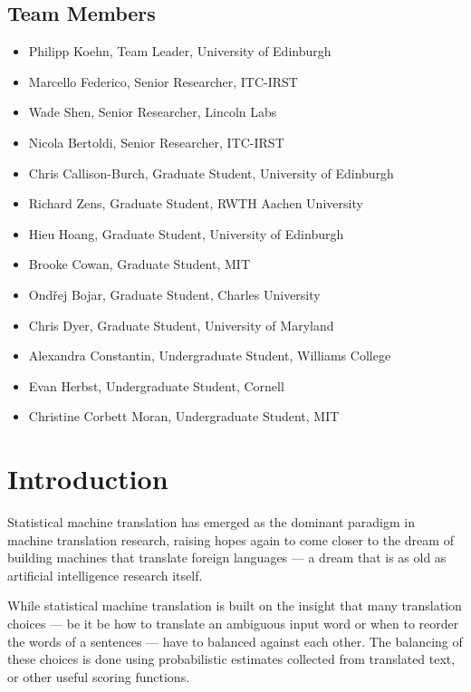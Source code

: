 \documentclass[11pt]{report}
\theoremstyle{plain}
\begin{document}
\newpage
\section*{Team Members}

\begin{itemize}
\item Philipp Koehn, Team Leader, University of Edinburgh
\item Marcello Federico, Senior Researcher, ITC-IRST
\item Wade Shen, Senior Researcher, Lincoln Labs
\item Nicola Bertoldi, Senior Researcher, ITC-IRST
\item Chris Callison-Burch, Graduate Student, University of Edinburgh
\item Richard Zens, Graduate Student, RWTH Aachen University
\item Hieu Hoang, Graduate Student, University of Edinburgh
\item Brooke Cowan, Graduate Student, MIT
\item Ond\v{r}ej Bojar, Graduate Student, Charles University
\item Chris Dyer, Graduate Student, University of Maryland
\item Alexandra Constantin, Undergraduate Student, Williams College
\item Evan Herbst, Undergraduate Student, Cornell
\item Christine Corbett Moran, Undergraduate Student, MIT
\end{itemize}

\tableofcontents

\chapter{Introduction}
Statistical machine translation has emerged as the dominant paradigm in machine translation research, raising hopes again to come closer to the dream of building machines that translate foreign languages --- a dream that is as old as artificial intelligence research itself.

While statistical machine translation is built on the insight that many translation choices --- be it be how to translate an ambiguous input word or when to reorder the words of a sentences --- have to balanced against each other. The balancing of these choices is done using probabilistic estimates collected from translated text, or other useful scoring functions.
\end{document}
